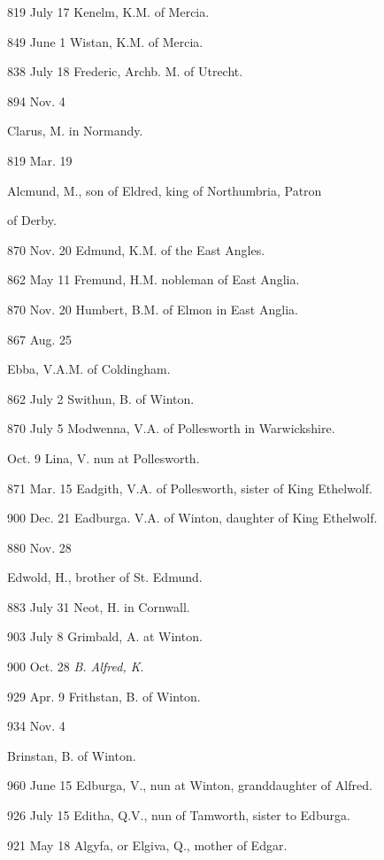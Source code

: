 819 July
17
Kenelm, K.M. of Mercia.

849 June
1
Wistan, K.M. of Mercia.

838 July
18
Frederic, Archb. M. of Utrecht.

894 Nov.
4

Clarus, M. in Normandy.


819 Mar.
19

Alcmund, M., son of Eldred, king of Northumbria, Patron

of Derby.

870 Nov.
20
Edmund, K.M. of the East Angles.

862 May
11
Fremund, H.M. nobleman of East Anglia.

870 Nov.
20
Humbert, B.M. of Elmon in East Anglia.

867 Aug.
25

Ebba, V.A.M. of Coldingham.


862 July
2
Swithun,
B. of Winton.

870 July
5
Modwenna, V.A. of Pollesworth in Warwickshire.

Oct. 9
Lina, V. nun at Pollesworth.

871 Mar.
15
Eadgith, V.A. of Pollesworth, sister of King Ethelwolf.

900 Dec.
21
Eadburga. V.A. of Winton, daughter of King Ethelwolf.

880 Nov.
28

Edwold, H., brother of St. Edmund.


883 July
31
Neot,
H. in Cornwall.

903 July
8
Grimbald, A. at Winton.

900 Oct.
28
\emph{B. Alfred, K}.

929 Apr.
9
Frithstan, B. of Winton.

934 Nov.
4

Brinstan, B. of Winton.


960 June 15
Edburga, V., nun
at Winton, granddaughter of Alfred.

926 July 15
Editha, Q.V., nun of Tamworth, sister to Edburga.

921 May 18
Algyfa, or Elgiva, Q., mother of Edgar.


